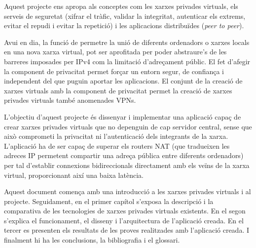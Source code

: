 \portada

\begin{resum}{7.8cm}
Aquest projecte ens apropa als conceptes com les xarxes privades virtuals, els serveis de seguretat (xifrar el tràfic, validar la integritat, autenticar els extrems, evitar el repudi i evitar la repetició) i les aplicacions distribuïdes (\emph{peer to peer}).

Avui en dia, la funció de permetre la unió de diferents ordenadors o xarxes locals en una nova xarxa virtual, pot ser aprofitada per poder abstraure's de les barreres imposades per IPv4 com la limitació d'adreçament públic. El fet d'afegir la component de privacitat permet forçar un entorn segur, de confiança i independent del que puguin aportar les aplicacions. El conjunt de la creació de xarxes virtuals amb la component de privacitat permet la creació de xarxes privades virtuals també anomenades VPNs.

L'objectiu d'aquest projecte és dissenyar i implementar una aplicació capaç de crear xarxes privades virtuals que no depenguin de cap servidor central, sense que això comprometi la privacitat ni l'autenticació dels integrants de la xarxa. L'aplicació ha de ser capaç de superar els routers NAT (que tradueixen les adreces IP permetent compartir una adreça pública entre diferents ordenadors) per tal d'establir connexions bidireccionals directament amb els veïns de la xarxa virtual, proporcionant així una baixa latència.

Aquest document comença amb una introducció a les xarxes privades virtuals i al projecte.
Seguidament, en el primer capítol s'exposa la descripció i la comparativa de les tecnologies de xarxes privades virtuals existents.
En el segon s'explica el funcionament, el disseny i l'arquitectura de l'aplicació creada.
En el tercer es presenten els resultats de les proves realitzades amb l'aplicació creada.
I finalment hi ha les conclusions, la bibliografia i el glossari.
\end{resum}

